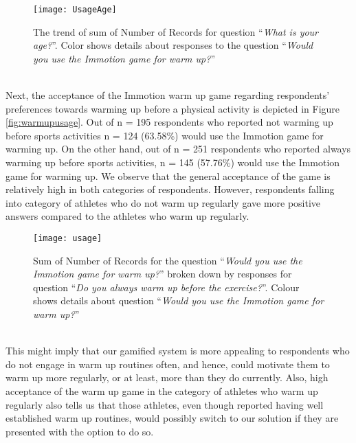 \begin{figure}[h]
    \centering
    \texttt{[image: UsageAge]}
    \caption [Age groups willing to use the prototype exergame.]{The trend of sum of Number of Records for question ``\textit{What is your age?}''. Color shows details about responses to the question ``\textit{Would you use the Immotion game for warm up?}''}
    \label{fig:UsageAge}
\end{figure}\\
Next, the acceptance of the Immotion warm up game regarding respondents' preferences towards warming up before a physical activity is depicted in Figure \ref{fig:warmupusage}. Out of n = 195 respondents who reported not warming up before sports activities n = 124 (63.58\%) would use the Immotion game for warming up. On the other hand, out of n = 251 respondents who reported always warming up before sports activities, n = 145 (57.76\%) would use the Immotion game for warming up. We observe that the general acceptance of the game is relatively high in both categories of respondents. However, respondents falling into category of athletes who do not warm up regularly gave more positive answers compared to the athletes who warm up regularly.\\
\begin{figure}[h]
    \centering
    \texttt{[image: usage]}
    \caption [Results for the Immotion prototype related question.]{Sum of Number of Records for the question ``\textit{Would you use the Immotion game for warm up?}'' broken down by responses for question ``\textit{Do you always warm up before the exercise?}''. Colour shows details about question ``\textit{Would you use the Immotion game for warm up?}''}
    \label{fig:usage}
\end{figure}\\
This might imply that our gamified system is more appealing to respondents who do not engage in warm up routines often, and hence, could motivate them to warm up more regularly, or at least, more than they do currently. Also, high acceptance of the warm up game in the category of athletes who warm up regularly also tells us that those athletes, even though reported having well established warm up routines, would possibly switch to our solution if they are presented with the option to do so. 
